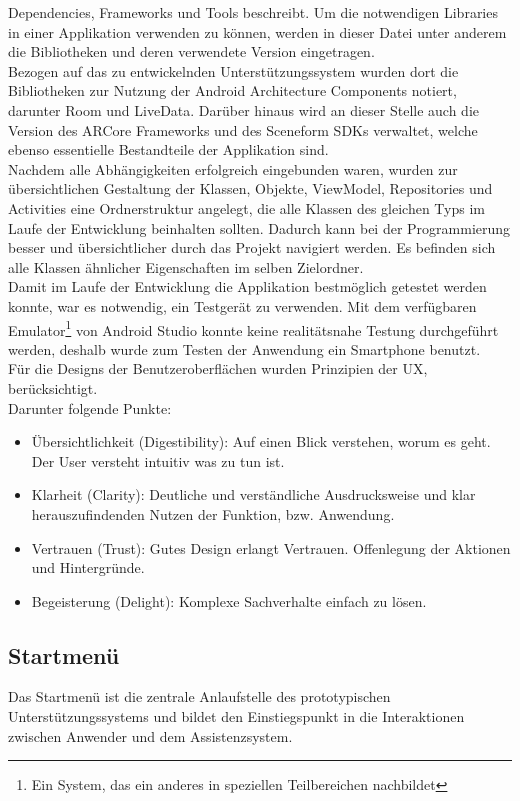 Dependencies, Frameworks und Tools beschreibt. Um die notwendigen Libraries in einer Applikation verwenden zu können, werden in dieser Datei unter 
anderem die Bibliotheken und deren verwendete Version eingetragen. 
\\ 
\linebreak 
Bezogen auf das zu entwickelnden Unterstützungssystem wurden dort die Bibliotheken zur Nutzung der Android Architecture Components notiert, darunter 
Room und LiveData. 
Darüber hinaus wird an dieser Stelle auch die Version des ARCore Frameworks und des Sceneform \acs{SDK}s verwaltet, welche ebenso essentielle Bestandteile der 
Applikation sind.
\\ 
Nachdem alle Abhängigkeiten erfolgreich eingebunden waren, wurden zur übersichtlichen Gestaltung der Klassen, Objekte, ViewModel, Repositories und Activities 
eine Ordnerstruktur angelegt, die alle Klassen des gleichen Typs im Laufe der Entwicklung beinhalten sollten. Dadurch kann bei der Programmierung besser und 
übersichtlicher durch das Projekt navigiert werden. Es befinden sich alle Klassen ähnlicher Eigenschaften im selben Zielordner. 
\\ 
\linebreak
Damit im Laufe der Entwicklung die Applikation bestmöglich getestet werden konnte, war es notwendig, ein Testgerät zu verwenden. Mit dem verfügbaren 
Emulator\footnote{Ein System, das ein anderes in speziellen Teilbereichen nachbildet} von Android Studio konnte keine realitätsnahe Testung 
durchgeführt werden, deshalb wurde zum Testen der Anwendung ein Smartphone benutzt.
\\ 
\linebreak
Für die Designs der Benutzeroberflächen wurden Prinzipien der \ac{UX}, berücksichtigt. 
\\ 
Darunter folgende Punkte: 
\begin{itemize}
    \item Übersichtlichkeit (Digestibility): Auf einen Blick verstehen, worum es geht. Der User versteht intuitiv was zu tun ist.
    \item Klarheit (Clarity): Deutliche und verständliche Ausdrucksweise und klar herauszufindenden Nutzen der Funktion, bzw. Anwendung.
    \item Vertrauen (Trust): Gutes Design erlangt Vertrauen. Offenlegung der Aktionen und Hintergründe. 
    \item Begeisterung (Delight): Komplexe Sachverhalte einfach zu lösen. 
\end{itemize} 
\subsection{Startmenü}
Das Startmenü ist die zentrale Anlaufstelle des prototypischen Unterstützungssystems und bildet den Einstiegspunkt in die Interaktionen zwischen Anwender 
und dem Assistenzsystem. 
